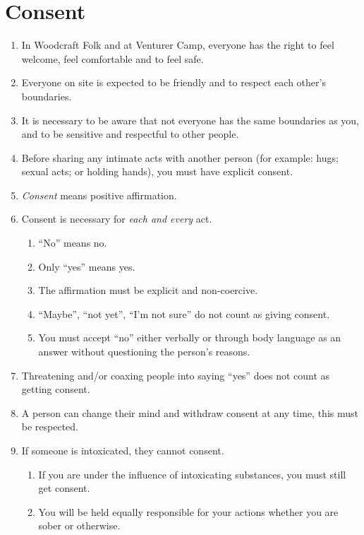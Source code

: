 \documentclass[a4paper, 11pt]{report}
\def\enumMarginIndentOne{4em}
\begin{document}
    \chapter{Consent}
    \begin{enumerate}
        \item In Woodcraft Folk and at Venturer Camp, everyone has the right to feel welcome, feel comfortable and to feel safe.
        \item Everyone on site is expected to be friendly and to respect each other's boundaries.
        \item It is necessary to be aware that not everyone has the same boundaries as you, and to be sensitive and respectful to other people.
        \item Before sharing any intimate acts with another person (for example: hugs; sexual acts; or holding hands), you must have explicit consent.
        \item \textit{Consent} means positive affirmation.
        \item Consent is necessary for \textit{each and every} act. 
        \begin{enumerate}[leftmargin=\enumMarginIndentOne]
            \item ``No'' means no.
            \item Only ``yes'' means yes.
            \item The affirmation must be explicit and non-coercive.
            \item ``Maybe'', ``not yet'', ``I'm not sure'' do not count as giving consent.
            \item You must accept ``no'' either verbally or through body language as an answer without questioning the person's reasons.
        \end{enumerate}
        \item Threatening and/or coaxing people into saying ``yes'' does not count as getting consent.
        \item A person can change their mind and withdraw consent at any time, this must be respected.
        \item If someone is intoxicated, they cannot consent.
        \begin{enumerate}[leftmargin=\enumMarginIndentOne]
            \item If you are under the influence of intoxicating substances, you must still get consent.
            \item You will be held equally responsible for your actions whether you are sober or otherwise.

\end{enumerate}
\end{enumerate}
\end{document}
